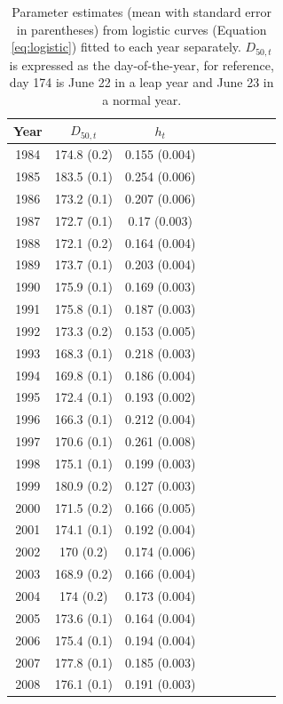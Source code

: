 \documentclass[12pt,]{book}
\theoremstyle{definition}
\theoremstyle{definition}
\theoremstyle{definition}
\theoremstyle{remark}
\begin{document}
\begin{singlespace}

\begin{table}

\caption{\label{tab:rt-ests-table}Parameter estimates (mean with standard error in parentheses) from
      logistic curves (Equation \ref{eq:logistic}) fitted to each year separately. $D_{50,t}$ is expressed
      as the day-of-the-year, for reference, day 174 is June 22 in a leap year and June 23 in a normal year.}
\centering
\begin{tabular}[t]{ccccccccc}
\toprule
Year & $D_{50,t}$ & $h_t$\\
\midrule
1984 & 174.8 (0.2) & 0.155 (0.004)\\
1985 & 183.5 (0.1) & 0.254 (0.006)\\
1986 & 173.2 (0.1) & 0.207 (0.006)\\
1987 & 172.7 (0.1) & 0.17 (0.003)\\
1988 & 172.1 (0.2) & 0.164 (0.004)\\
1989 & 173.7 (0.1) & 0.203 (0.004)\\
1990 & 175.9 (0.1) & 0.169 (0.003)\\
1991 & 175.8 (0.1) & 0.187 (0.003)\\
1992 & 173.3 (0.2) & 0.153 (0.005)\\
1993 & 168.3 (0.1) & 0.218 (0.003)\\
1994 & 169.8 (0.1) & 0.186 (0.004)\\
1995 & 172.4 (0.1) & 0.193 (0.002)\\
1996 & 166.3 (0.1) & 0.212 (0.004)\\
1997 & 170.6 (0.1) & 0.261 (0.008)\\
1998 & 175.1 (0.1) & 0.199 (0.003)\\
1999 & 180.9 (0.2) & 0.127 (0.003)\\
2000 & 171.5 (0.2) & 0.166 (0.005)\\
2001 & 174.1 (0.1) & 0.192 (0.004)\\
2002 & 170 (0.2) & 0.174 (0.006)\\
2003 & 168.9 (0.2) & 0.166 (0.004)\\
2004 & 174 (0.2) & 0.173 (0.004)\\
2005 & 173.6 (0.1) & 0.164 (0.004)\\
2006 & 175.4 (0.1) & 0.194 (0.004)\\
2007 & 177.8 (0.1) & 0.185 (0.003)\\
2008 & 176.1 (0.1) & 0.191 (0.003)\\

\end{tabular}
\end{table}
\end{singlespace}
\end{document}
